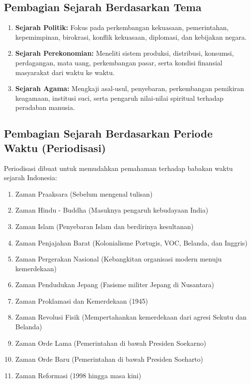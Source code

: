 \documentclass[12pt, a4paper]{article}
\begin{document}
\subsection{Pembagian Sejarah Berdasarkan Tema}
\begin{enumerate}
	\item \textbf{Sejarah Politik:} Fokus pada perkembangan kekuasaan, pemerintahan, kepemimpinan, birokrasi, konflik kekuasaan, diplomasi, dan kebijakan negara.
	\item \textbf{Sejarah Perekonomian:} Meneliti sistem produksi, distribusi, konsumsi, perdagangan, mata uang, perkembangan pasar, serta kondisi finansial masyarakat dari waktu ke waktu.
	\item \textbf{Sejarah Agama:} Mengkaji asal-usul, penyebaran, perkembangan pemikiran keagamaan, institusi suci, serta pengaruh nilai-nilai spiritual terhadap peradaban manusia.
\end{enumerate}

\subsection{Pembagian Sejarah Berdasarkan Periode Waktu (Periodisasi)}
Periodisasi dibuat untuk memudahkan pemahaman terhadap babakan waktu sejarah Indonesia:
\begin{enumerate}
	\item Zaman Praaksara (Sebelum mengenal tulisan)
	\item Zaman Hindu - Buddha (Masuknya pengaruh kebudayaan India)
	\item Zaman Islam (Penyebaran Islam dan berdirinya kesultanan)
	\item Zaman Penjajahan Barat (Kolonialisme Portugis, VOC, Belanda, dan Inggris)
	\item Zaman Pergerakan Nasional (Kebangkitan organisasi modern menuju kemerdekaan)
	\item Zaman Pendudukan Jepang (Fasisme militer Jepang di Nusantara)
	\item Zaman Proklamasi dan Kemerdekaan (1945)
	\item Zaman Revolusi Fisik (Mempertahankan kemerdekaan dari agresi Sekutu dan Belanda)
	\item Zaman Orde Lama (Pemerintahan di bawah Presiden Soekarno)
	\item Zaman Orde Baru (Pemerintahan di bawah Presiden Soeharto)
	\item Zaman Reformasi (1998 hingga masa kini)
\end{enumerate}
\end{document}
